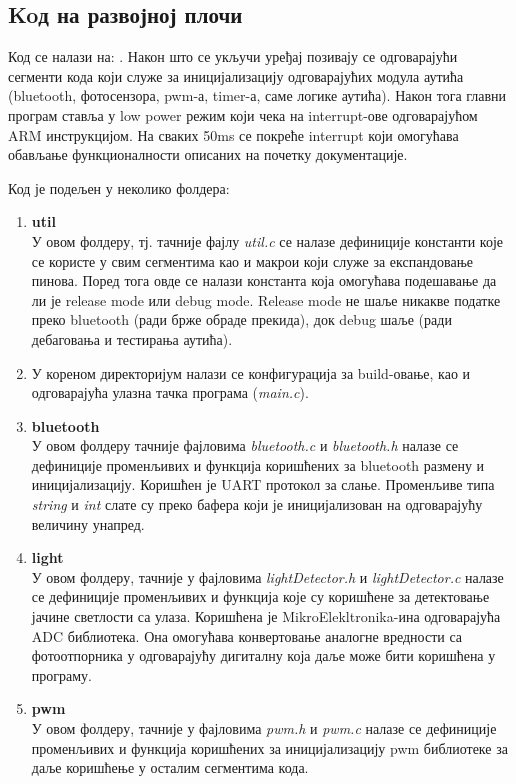 	\subsection{Koд на развојној плочи}
Код се налази на: \cite{Code}. Након што се укључи уређај позивају се одговарајући сегменти кода који служе за иницијализацију одговарајућих модула аутића (bluetooth, фотосензора, pwm-а, timer-а, саме логике аутића). Након тога главни програм ставља у low power режим који чека на interrupt-ове одговарајућом ARM инструкцијом. На сваких 50ms се покреће interrupt који омогућава обављање функционалности описаних на почетку документације. 

Код је подељен у неколико фолдера:
\begin{enumerate}[1.]
	\item \textbf{util}\\
	У овом фолдеру, тј. тачније фајлу \textit{util.c} се налазе дефиниције константи које се користе у свим сегментима као и макрои који служе за експандовање пинова. Поред тога овде се налази константа која омогућава подешавање да ли је release mode или debug mode. Release mode не шаље никакве податке преко bluetooth (ради брже обраде прекида), док debug шаље (ради дебаговања и тестирања аутића). 
	\item \textbf{}
		У кореном директоријум налази се конфигурација за build-овање, као и одговарајућа улазна тачка програма (\textit{main.c}). 
	\item \textbf{bluetooth}\\
		У овом фолдеру тачније фајловима \textit{bluetooth.c} и \textit{bluetooth.h} налазе се дефиниције променљивих и функција коришћених за bluetooth размену и иницијализацију. Коришћен је UART протокол за слање. Променљиве типа \textit{string }и \textit{int } слате су преко бафера који је иницијализован на одговарајућу величину унапред.
	\item \textbf{light}\\
	У овом фолдеру, тачније у фајловима \textit{lightDetector.h} и \textit{lightDetector.c} налазе се дефиниције променљивих и функција које су коришћене за детектовање јачине светлости са улаза. Коришћена је MikroElekltronika-ина одговарајућа ADC библиотека. Она омогућава конвертовање аналогне вредности са фотоотпорника у одговарајућу дигиталну која даље може бити коришћена у програму.
	\item \textbf{pwm}\\
		У овом фолдеру, тачније у фајловима \textit{pwm.h} и \textit{pwm.c} налазе се дефиниције променљивих и функција коришћених за иницијализацију pwm библиотеке за даље коришћење у осталим сегментима кода. 

\end{enumerate}
